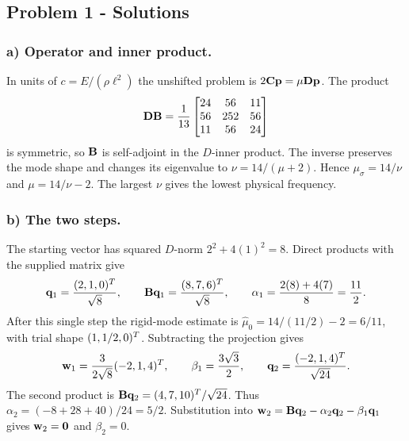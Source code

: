 \documentclass[12pt]{article}
\begin{document}
\subsection*{Problem 1 - Solutions}
\subsubsection*{a) Operator and inner product.}
In units of $c=E/(\rho\ell^2)$ the unshifted problem is
$2\mathbf{C}\mathbf{p}=\mu\mathbf{D}\mathbf{p}$. The product
\[
  \mathbf{D}\mathbf{B}=\frac1{13}\begin{bmatrix}24&56&11\\56&252&56\\11&56&24\end{bmatrix}
\]
is symmetric, so $\mathbf{B}$ is self-adjoint in the $D$-inner product.
The inverse preserves the mode shape and changes its eigenvalue to
$\nu=14/(\mu+2)$. Hence $\mu_\sigma=14/\nu$ and $\mu=14/\nu-2$.
The largest $\nu$ gives the lowest physical frequency.

\subsubsection*{b) The two steps.}
The starting vector has squared $D$-norm $2^2+4(1)^2=8$. Direct products
with the supplied matrix give
\[
  \mathbf{q}_1=\frac{(2,1,0)^{T}}{\sqrt8},\qquad
  \mathbf{B}\mathbf{q}_1=\frac{(8,7,6)^{T}}{\sqrt8},\qquad
  \alpha_1=\frac{2(8)+4(7)}8=\frac{11}{2}.
\]
After this single step the rigid-mode estimate is
$\widehat\mu_0=14/(11/2)-2=6/11$, with trial shape $(1,1/2,0)^{T}$.
Subtracting the projection gives
\[
  \mathbf{w}_1=\frac{3}{2\sqrt8}(-2,1,4)^{T},\qquad
  \beta_1=\frac{3\sqrt3}{2},\qquad
  \mathbf{q}_2=\frac{(-2,1,4)^{T}}{\sqrt{24}}.
\]
The second product is $\mathbf{B}\mathbf{q}_2=(4,7,10)^{T}/\sqrt{24}$.
Thus $\alpha_2=(-8+28+40)/24=5/2$. Substitution into
$\mathbf{w}_2=\mathbf{B}\mathbf{q}_2-\alpha_2\mathbf{q}_2-\beta_1\mathbf{q}_1$ gives
$\mathbf{w}_2=\mathbf{0}$ and $\beta_2=0$.
\end{document}
